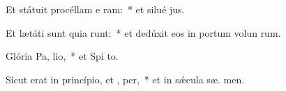 \item Et státuit procéllam e  ram:~* et silué  jus.
\item Et lætáti sunt quia runt:~* et dedúxit eos in portum volun rum.
\item Glória Pa,  lio,~* et Spi to.
\item Sicut erat in princípio, et ,  per,~* et in sǽcula sæ. men.
